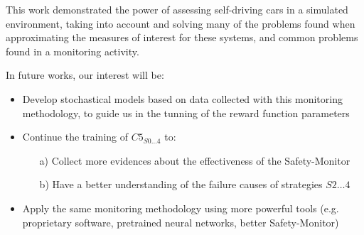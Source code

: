This work demonstrated the power of assessing self-driving cars in a simulated environment, taking into account and solving many of the problems found when approximating the measures of interest for these systems, and common problems found in a monitoring activity.

In future works, our interest will be:

\begin{itemize}
	\item Develop stochastical models based on data collected with this monitoring methodology, to guide us in the tunning of the reward function parameters
	\item Continue the training of $C5_{S0\dots 4}$ to:
	\begin{itemize}
		\item[a)] Collect more evidences about the effectiveness of the Safety-Monitor
		\item[b)] Have a better understanding of the failure causes of strategies $S2\dots 4$
	\end{itemize}
	\item Apply the same monitoring methodology using more powerful tools (e.g. proprietary software, pretrained neural networks, better Safety-Monitor)
\end{itemize}
